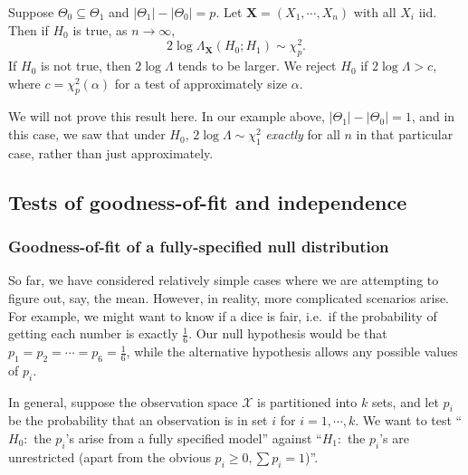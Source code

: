 \documentclass[a4paper]{article}
\begin{document}
\begin{thm}
  Suppose $\Theta_0 \subseteq \Theta_1$ and $|\Theta_1| - |\Theta_0| = p$. Let $\mathbf{X} = (X_1, \cdots, X_n)$ with all $X_i$ iid. Then if $H_0$ is true, as $n\to \infty$,
  \[
    2\log \Lambda_\mathbf{X}(H_0;H_1)\sim \chi_p^2.
  \]
  If $H_0$ is not true, then $2\log \Lambda$ tends to be larger. We reject $H_0$ if $2\log \Lambda > c$, where $c = \chi_p^2(\alpha)$ for a test of approximately size $\alpha$.
\end{thm}

We will not prove this result here. In our example above, $|\Theta_1| - |\Theta_0| = 1$, and in this case, we saw that under $H_0$, $2\log \Lambda \sim \chi_1^2$ \emph{exactly} for all $n$ in that particular case, rather than just approximately.

\subsection{Tests of goodness-of-fit and independence}
\subsubsection{Goodness-of-fit of a fully-specified null distribution}
So far, we have considered relatively simple cases where we are attempting to figure out, say, the mean. However, in reality, more complicated scenarios arise. For example, we might want to know if a dice is fair, i.e.\ if the probability of getting each number is exactly $\frac{1}{6}$. Our null hypothesis would be that $p_1 = p_2 = \cdots = p_6 = \frac{1}{6}$, while the alternative hypothesis allows any possible values of $p_i$.

In general, suppose the observation space $\mathcal{X}$ is partitioned into $k$ sets, and let $p_i$ be the probability that an observation is in set $i$ for $i = 1, \cdots, k$. We want to test ``$H_0:$ the $p_i$'s arise from a fully specified model'' against ``$H_1:$ the $p_i$'s are unrestricted (apart from the obvious $p_i \geq 0, \sum p_i = 1$)''.
\end{document}
